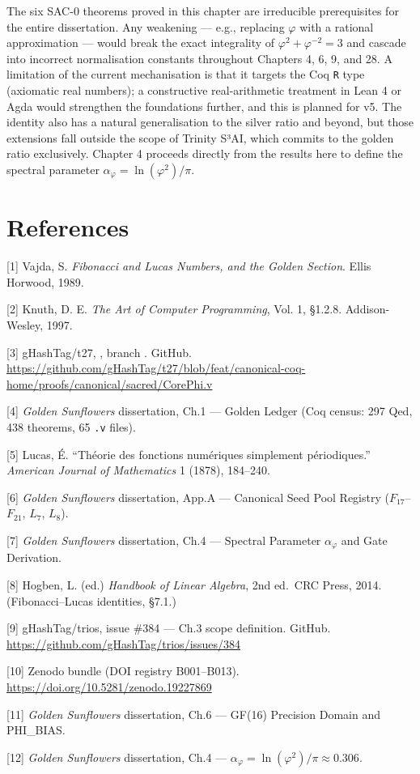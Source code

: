 The six SAC-0 theorems proved in this chapter are
irreducible prerequisites for the entire
dissertation. Any weakening --- e.g., replacing
\(\varphi\) with a rational approximation ---
would break the exact integrality of
\(\varphi^2 + \varphi^{-2} = 3\) and cascade into
incorrect normalisation constants throughout
Chapters 4, 6, 9, and 28. A limitation of the
current mechanisation is that it targets the Coq
\texttt{R} type (axiomatic real numbers); a
constructive real-arithmetic treatment in Lean 4
or Agda would strengthen the foundations further,
and this is planned for v5. The identity also has
a natural generalisation to the silver ratio and
beyond, but those extensions fall outside the
scope of Trinity S³AI, which commits to the golden
ratio exclusively. Chapter 4 proceeds directly
from the results here to define the spectral
parameter \(\alpha_\varphi = \ln(\varphi^2)/\pi\).

\section{References}\label{fa_03:references}

[1] Vajda, S. \emph{Fibonacci and Lucas
Numbers, and the Golden Section}. Ellis Horwood,
1989.

[2] Knuth, D. E. \emph{The Art of Computer
Programming}, Vol. 1, §1.2.8. Addison-Wesley,
1997.

[3] gHashTag/t27,
, branch
. GitHub.
\url{https://github.com/gHashTag/t27/blob/feat/canonical-coq-home/proofs/canonical/sacred/CorePhi.v}

[4] \emph{Golden Sunflowers} dissertation,
Ch.1 --- Golden Ledger (Coq census: 297 Qed, 438
theorems, 65 \texttt{.v} files).

[5] Lucas, É. ``Théorie des fonctions
numériques simplement périodiques.''
\emph{American Journal of Mathematics} 1 (1878),
184--240.

[6] \emph{Golden Sunflowers} dissertation,
App.A --- Canonical Seed Pool Registry
(\(F_{17}\)--\(F_{21}\), \(L_7\), \(L_8\)).

[7] \emph{Golden Sunflowers} dissertation,
Ch.4 --- Spectral Parameter \(\alpha_\varphi\) and
Gate Derivation.

[8] Hogben, L. (ed.) \emph{Handbook of Linear
Algebra}, 2nd ed.~CRC Press, 2014.
(Fibonacci--Lucas identities, §7.1.)

[9] gHashTag/trios, issue \#384 --- Ch.3 scope
definition. GitHub.
\url{https://github.com/gHashTag/trios/issues/384}

[10] Zenodo bundle (DOI registry B001--B013).
\url{https://doi.org/10.5281/zenodo.19227869}

[11] \emph{Golden Sunflowers} dissertation,
Ch.6 --- GF(16) Precision Domain and PHI\_BIAS.

[12] \emph{Golden Sunflowers} dissertation,
Ch.4 ---
\(\alpha_\varphi = \ln(\varphi^2)/\pi \approx 0.306\).
